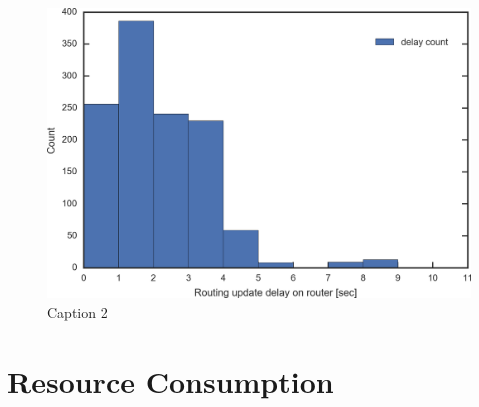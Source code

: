 \begin{figure}[t]
  \includegraphics[width=0.9\columnwidth,left]{Figs/ecmp_delay_histgram_ieice}
  \caption{Caption 2}
  \label{fig:ecmp_delay_histgram_ieice}
\end{figure}


\section{Resource Consumption}



